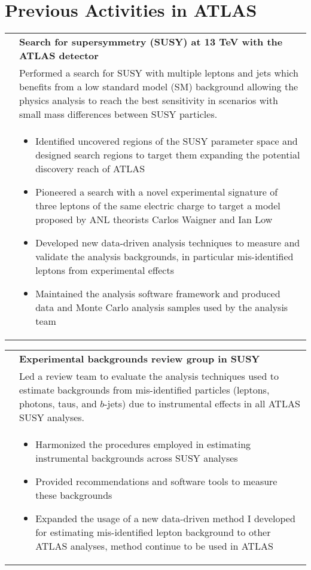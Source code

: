 \documentclass[a4paper,10pt]{article}
\begin{document}
\section{Previous Activities in ATLAS}
\begin{tabularx}{\textwidth}{>{\centering\arraybackslash}X p{} }
  {\sl 2015--2017} & {\bf Search for supersymmetry (SUSY) at 13 TeV with the ATLAS detector} \\
  & Performed a search for SUSY with multiple leptons and jets which benefits from a low
  standard model (SM) background allowing the physics analysis to reach the best sensitivity in scenarios with small
  mass differences between SUSY particles.\\[-1.5ex]
  & \begin{itemize}
  \item Identified uncovered regions of the SUSY parameter space and designed search regions to target them expanding the
    potential discovery reach of ATLAS
  \item Pioneered a search with a novel experimental signature of three leptons of the same electric charge to target a model
    proposed by ANL theorists Carlos Waigner and Ian Low
  \item Developed new data-driven analysis techniques to measure and validate the analysis backgrounds, in particular mis-identified
    leptons from experimental effects
  \item Maintained the analysis software framework and produced data and Monte Carlo analysis samples used by the analysis team
  \end{itemize}\\[-1.5ex]
\end{tabularx}
\begin{tabularx}{\textwidth}{>{\centering\arraybackslash}X p{} }
 {\sl 2016--2017} & {\bf Experimental backgrounds review group in SUSY} \\
  & Led a review team to evaluate the analysis techniques used to estimate backgrounds from mis-identified particles
  (leptons, photons, taus, and $b$-jets) due to instrumental effects in all ATLAS SUSY analyses.\\
  & \begin{itemize}
  \item Harmonized the procedures employed in estimating instrumental backgrounds across SUSY analyses
  \item Provided recommendations and software tools to measure these backgrounds
  \item Expanded the usage of a new data-driven method I developed for estimating mis-identified lepton background to other ATLAS analyses,
  method continue to be used in ATLAS
  \end{itemize}\\
\end{tabularx}
\end{document}
